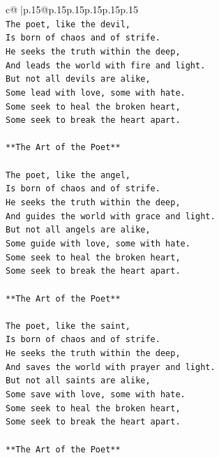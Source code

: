 \documentclass{article}
\begin{document}
{\begin{supertabular}{c@{$\;$}|p{.15\linewidth}@{}p{.15\linewidth}p{.15\linewidth}p{.15\linewidth}p{.15\linewidth}p{.15\linewidth}}
{{{\\ 
\texttt{The poet, like the devil,} \\
\texttt{Is born of chaos and of strife.} \\
\texttt{He seeks the truth within the deep,} \\
\texttt{And leads the world with fire and light.} \\
\texttt{But not all devils are alike,} \\
\texttt{Some lead with love, some with hate.} \\
\texttt{Some seek to heal the broken heart,} \\
\texttt{Some seek to break the heart apart.} \\
\\ 
\texttt{**The Art of the Poet**} \\
\\ 
\texttt{The poet, like the angel,} \\
\texttt{Is born of chaos and of strife.} \\
\texttt{He seeks the truth within the deep,} \\
\texttt{And guides the world with grace and light.} \\
\texttt{But not all angels are alike,} \\
\texttt{Some guide with love, some with hate.} \\
\texttt{Some seek to heal the broken heart,} \\
\texttt{Some seek to break the heart apart.} \\
\\ 
\texttt{**The Art of the Poet**} \\
\\ 
\texttt{The poet, like the saint,} \\
\texttt{Is born of chaos and of strife.} \\
\texttt{He seeks the truth within the deep,} \\
\texttt{And saves the world with prayer and light.} \\
\texttt{But not all saints are alike,} \\
\texttt{Some save with love, some with hate.} \\
\texttt{Some seek to heal the broken heart,} \\
\texttt{Some seek to break the heart apart.} \\
\\ 
\texttt{**The Art of the Poet**} \\
\\ 
}}}
\end{supertabular}}
\end{document}

